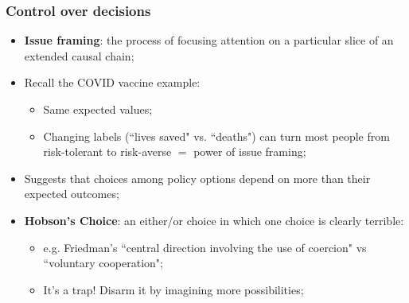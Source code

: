\documentclass[aspectratio=169]{beamer}
\theoremstyle{principle}
\begin{document}
\begin{frame}
\frametitle{Control over decisions}
\begin{itemize}
\item \textbf{Issue framing}: the process of focusing attention on a particular slice of an extended causal chain;
\bigskip
\item Recall the COVID vaccine example:
\begin{itemize}
\item Same expected values;
\item Changing labels (``lives saved" vs. ``deaths") can turn most people from risk-tolerant to risk-averse $=$ power of issue framing;
\end{itemize}
\bigskip
\item Suggests that choices among policy options depend on more than their expected outcomes;
\bigskip
\item \textbf{Hobson's Choice}: an either/or choice in which one choice is clearly terrible:
\begin{itemize}
\item e.g. Friedman's ``central direction involving the use of coercion" vs ``voluntary cooperation";
\item It's a trap!  Disarm it by imagining more possibilities;
\end{itemize}
\end{itemize}
\end{frame}

\end{document}
